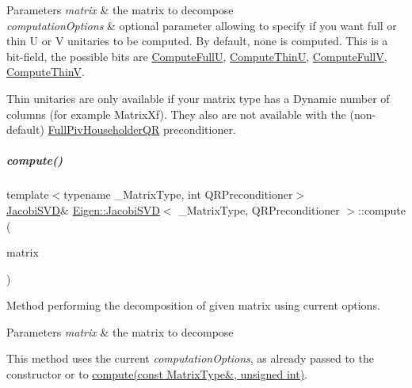 \begin{DoxyParams}{Parameters}
{\em matrix} & the matrix to decompose \\
\hline
{\em computation\+Options} & optional parameter allowing to specify if you want full or thin U or V unitaries to be computed. By default, none is computed. This is a bit-\/field, the possible bits are \hyperlink{group__enums_ggae3e239fb70022eb8747994cf5d68b4a9a2b4f91ca5859a4159dbfe8090043817f}{Compute\+FullU}, \hyperlink{group__enums_ggae3e239fb70022eb8747994cf5d68b4a9af8c742a1aa87773e165eae406c9ccaf8}{Compute\+ThinU}, \hyperlink{group__enums_ggae3e239fb70022eb8747994cf5d68b4a9a52c6f7e80bbf9a42297c88f700245b51}{Compute\+FullV}, \hyperlink{group__enums_ggae3e239fb70022eb8747994cf5d68b4a9a1055e53fa95c8ae04a07ebb72cfafd95}{Compute\+ThinV}.\\
\hline
\end{DoxyParams}
Thin unitaries are only available if your matrix type has a Dynamic number of columns (for example Matrix\+Xf). They also are not available with the (non-\/default) \hyperlink{group___q_r___module_class_eigen_1_1_full_piv_householder_q_r}{Full\+Piv\+Householder\+QR} preconditioner. \mbox{\label{group___s_v_d___module_acc7b9a4068cf7b69ae3227d217ed7efd}} 
\subparagraph{\texorpdfstring{compute()}{compute()}\hspace{0.1cm}{\footnotesize\ttfamily [3/4]}}
{\footnotesize\ttfamily template$<$typename \+\_\+\+Matrix\+Type, int Q\+R\+Preconditioner$>$ \\
\hyperlink{group___s_v_d___module_class_eigen_1_1_jacobi_s_v_d}{Jacobi\+S\+VD}\& \hyperlink{group___s_v_d___module_class_eigen_1_1_jacobi_s_v_d}{Eigen\+::\+Jacobi\+S\+VD}$<$ \+\_\+\+Matrix\+Type, Q\+R\+Preconditioner $>$\+::compute (\begin{DoxyParamCaption}\item[{const Matrix\+Type \&}]{matrix }\end{DoxyParamCaption})\hspace{0.3cm}{\ttfamily [inline]}}



Method performing the decomposition of given matrix using current options. 


\begin{DoxyParams}{Parameters}
{\em matrix} & the matrix to decompose\\
\hline
\end{DoxyParams}
This method uses the current {\itshape computation\+Options}, as already passed to the constructor or to \hyperlink{group___s_v_d___module_a5dab376cc86cf0d36674bcdad4af3f5a}{compute(const Matrix\+Type\&, unsigned int)}. 

